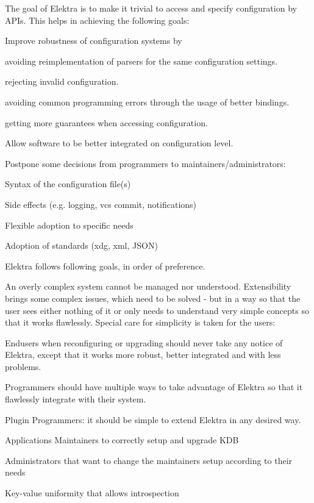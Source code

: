 The goal of Elektra is to make it trivial to access and specify configuration by A\+P\+Is. This helps in achieving the following goals\+:


\begin{DoxyItemize}
\item Improve robustness of configuration systems by
\begin{DoxyItemize}
\item avoiding reimplementation of parsers for the same configuration settings.
\item rejecting invalid configuration.
\item avoiding common programming errors through the usage of better bindings.
\item getting more guarantees when accessing configuration.
\end{DoxyItemize}
\item Allow software to be better integrated on configuration level.
\item Postpone some decisions from programmers to maintainers/administrators\+:
\begin{DoxyItemize}
\item Syntax of the configuration file(s)
\item Side effects (e.\+g. logging, vcs commit, notifications)
\item Flexible adoption to specific needs
\item Adoption of standards (xdg, xml, J\+S\+ON)
\end{DoxyItemize}
\end{DoxyItemize}

Elektra follows following goals, in order of preference.

An overly complex system cannot be managed nor understood. Extensibility brings some complex issues, which need to be solved -\/ but in a way so that the user sees either nothing of it or only needs to understand very simple concepts so that it works flawlessly. Special care for simplicity is taken for the users\+:


\begin{DoxyItemize}
\item Endusers when reconfiguring or upgrading should never take any notice of Elektra, except that it works more robust, better integrated and with less problems.
\item Programmers should have multiple ways to take advantage of Elektra so that it flawlessly integrate with their system.
\item Plugin Programmers\+: it should be simple to extend Elektra in any desired way.
\item Application\textquotesingle{}s Maintainers to correctly setup and upgrade K\+DB
\item Administrators that want to change the maintainers\textquotesingle{} setup according to their needs
\item Key-\/value uniformity that allows introspection
\end{DoxyItemize}

